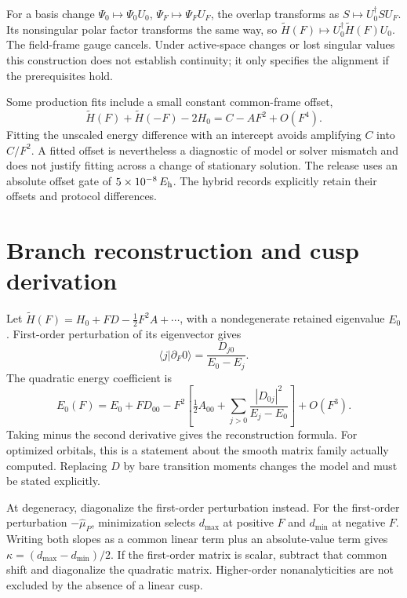 \documentclass[aip,jcp,amsmath,amssymb,preprint,floatfix]{revtex4-1}
\begin{document}
For a basis change $\Psi_0\mapsto\Psi_0U_0$, $\Psi_F\mapsto\Psi_FU_F$, the overlap transforms as $S\mapsto U_0^\dagger S U_F$. Its nonsingular polar factor transforms the same way, so $\widetilde H(F)\mapsto U_0^\dagger\widetilde H(F)U_0$. The field-frame gauge cancels. Under active-space changes or lost singular values this construction does not establish continuity; it only specifies the alignment if the prerequisites hold.

Some production fits include a small constant common-frame offset,
\begin{equation}
\widetilde H(F)+\widetilde H(-F)-2H_0
=C-AF^2+O(F^4).
\end{equation}
Fitting the unscaled energy difference with an intercept avoids amplifying $C$ into $C/F^2$. A fitted offset is nevertheless a diagnostic of model or solver mismatch and does not justify fitting across a change of stationary solution. The  release uses an absolute offset gate of $5\times10^{-8}\,E_{\mathrm h}$. The  hybrid records explicitly retain their offsets and protocol differences.

\section{Branch reconstruction and cusp derivation}\label{sec:branch}
Let $\widetilde H(F)=H_0+FD-\tfrac12F^2A+\cdots$, with a nondegenerate retained eigenvalue $E_0$. First-order perturbation of its eigenvector gives
\begin{equation}
\langle j|\partial_F0\rangle=\frac{D_{j0}}{E_0-E_j}.
\end{equation}
The quadratic energy coefficient is
\begin{equation}
E_0(F)=E_0+FD_{00}
-F^2\left[\tfrac12A_{00}+
\sum_{j>0}\frac{|D_{0j}|^2}{E_j-E_0}\right]+O(F^3).
\end{equation}
Taking minus the second derivative gives the reconstruction formula. For optimized orbitals, this is a statement about the smooth matrix family actually computed. Replacing $D$ by bare transition moments changes the model and must be stated explicitly.

At degeneracy, diagonalize the first-order perturbation instead. For the first-order perturbation $-\hat{\mu}_P$, minimization selects $d_{\max}$ at positive $F$ and $d_{\min}$ at negative $F$. Writing both slopes as a common linear term plus an absolute-value term gives $\kappa=(d_{\max}-d_{\min})/2$. If the first-order matrix is scalar, subtract that common shift and diagonalize the quadratic matrix. Higher-order nonanalyticities are not excluded by the absence of a linear cusp.
\end{document}
